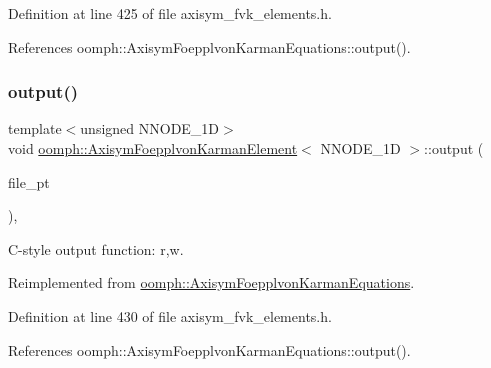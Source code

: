 Definition at line 425 of file axisym\+\_\+fvk\+\_\+elements.\+h.



References oomph\+::\+Axisym\+Foepplvon\+Karman\+Equations\+::output().

\mbox{\label{classoomph_1_1AxisymFoepplvonKarmanElement_a17a94d66cf74c7be11d8e0a514db1d92}} 
\subsubsection{\texorpdfstring{output()}{output()}\hspace{0.1cm}{\footnotesize\ttfamily [3/8]}}
{\footnotesize\ttfamily template$<$unsigned N\+N\+O\+D\+E\+\_\+1D$>$ \\
void \hyperlink{classoomph_1_1AxisymFoepplvonKarmanElement}{oomph\+::\+Axisym\+Foepplvon\+Karman\+Element}$<$ N\+N\+O\+D\+E\+\_\+1D $>$\+::output (\begin{DoxyParamCaption}\item[{F\+I\+LE $\ast$}]{file\+\_\+pt }\end{DoxyParamCaption})\hspace{0.3cm}{\ttfamily [inline]}, {\ttfamily [virtual]}}



C-\/style output function\+: r,w. 



Reimplemented from \hyperlink{classoomph_1_1AxisymFoepplvonKarmanEquations_a236f169caf08c0214ff686e939b9dd33}{oomph\+::\+Axisym\+Foepplvon\+Karman\+Equations}.



Definition at line 430 of file axisym\+\_\+fvk\+\_\+elements.\+h.



References oomph\+::\+Axisym\+Foepplvon\+Karman\+Equations\+::output().

\mbox{\label{classoomph_1_1AxisymFoepplvonKarmanElement_a09a7d0ec1c8c495c7703e6c034d8eafc}} 

